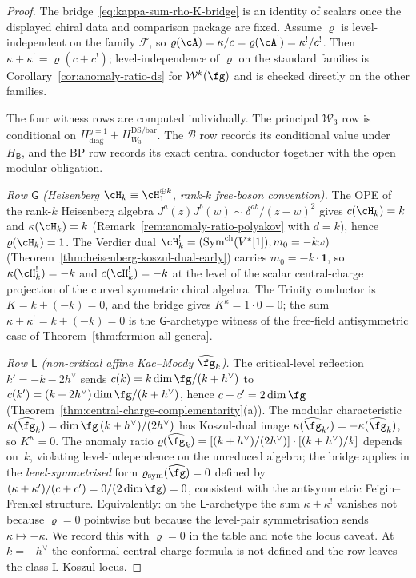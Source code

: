 \begin{proof}
The bridge~\eqref{eq:kappa-sum-rho-K-bridge} is an identity of scalars
once the displayed chiral data and comparison package are fixed. Assume $\varrho$ is
level-independent on the family $\mathcal{F}$, so
$\varrho(\cA) = \kappa/c = \varrho(\cA^!) = \kappa^!/c^!$. Then
$\kappa + \kappa^! = \varrho(c + c^!)$; level-independence of
$\varrho$ on the standard families is
Corollary~\ref{cor:anomaly-ratio-ds} for
$\mathcal{W}^k(\fg)$ and is checked directly on the other families.

The four witness rows are computed individually.  The principal
$\mathcal W_3$ row is conditional on
$H_{\mathrm{diag}}^{g=1}+H_{W_3}^{\mathrm{DS/bar}}$.  The
$\mathcal B$ row records its conditional value under~$H_{\mathsf B}$,
and the BP row records its exact central conductor together with the
open modular obligation.

\emph{Row $\mathsf{G}$ (Heisenberg
$\cH_k \equiv \cH_1^{\oplus k}$, rank-$k$ free-boson
convention).} The OPE of the rank-$k$ Heisenberg
algebra $J^a(z) J^b(w) \sim \delta^{ab}/(z-w)^2$ gives
$c(\cH_k) = k$ and $\kappa(\cH_k) = k$
\textup{(}Remark~\ref{rem:anomaly-ratio-polyakov} with
$d = k$\textup{)}, hence
$\varrho(\cH_k) = 1$. The Verdier dual
$\cH_k^!=(\mathrm{Sym}^{\mathrm{ch}}(V^*[1]),m_0=-k\omega)$
\textup{(}Theorem~\ref{thm:heisenberg-koszul-dual-early}\textup{)}
carries $m_0 = -k \cdot \mathbf{1}$, so
$\kappa(\cH_k^!) = -k$ and $c(\cH_k^!) = -k$ at the level of the
scalar central-charge projection of the curved symmetric chiral
algebra. The Trinity conductor is $K = k + (-k) = 0$, and the bridge
gives $K^\kappa = 1 \cdot 0 = 0$; the sum
$\kappa + \kappa^! = k + (-k) = 0$ is the $\mathsf{G}$-archetype
witness of the free-field antisymmetric case of
Theorem~\ref{thm:fermion-all-genera}.

\emph{Row $\mathsf{L}$ (non-critical affine Kac--Moody
$\widehat{\fg}_k$).} The
critical-level reflection \(k'=-k-2h^\vee\) sends
$c(k) = k\dim\fg/(k+h^\vee)$ to $c(k') = (k+2h^\vee)\dim\fg/(k+h^\vee)$,
hence $c + c' = 2\dim\fg$
\textup{(}Theorem~\ref{thm:central-charge-complementarity}(a)\textup{)}.
The modular characteristic $\kappa(\widehat{\fg}_k) = \dim\fg\,(k+h^\vee)/(2h^\vee)$
has Koszul-dual image
$\kappa(\widehat{\fg}_{k'}) = -\kappa(\widehat{\fg}_k)$, so
$K^\kappa = 0$. The anomaly ratio
$\varrho(\widehat{\fg}_k) = [(k+h^\vee)/(2h^\vee)] \cdot [(k+h^\vee)/k]$
depends on~$k$, violating level-independence on the unreduced algebra;
the bridge applies in the \emph{level-symmetrised} form
$\varrho_{\mathrm{sym}}(\widehat{\fg}) = 0$ defined by
$(\kappa + \kappa')/(c + c') = 0/(2\dim\fg) = 0$, consistent with the
antisymmetric Feigin--Frenkel structure. Equivalently: on the
$\mathsf{L}$-archetype the sum $\kappa + \kappa^!$ vanishes not because
$\varrho = 0$ pointwise but because the level-pair symmetrisation sends
$\kappa \mapsto -\kappa$. We record this with
$\varrho = 0$ in the table and note the locus
caveat. At $k=-h^\vee$ the conformal central charge formula is not
defined and the row leaves the class-L Koszul locus.


\end{proof}
